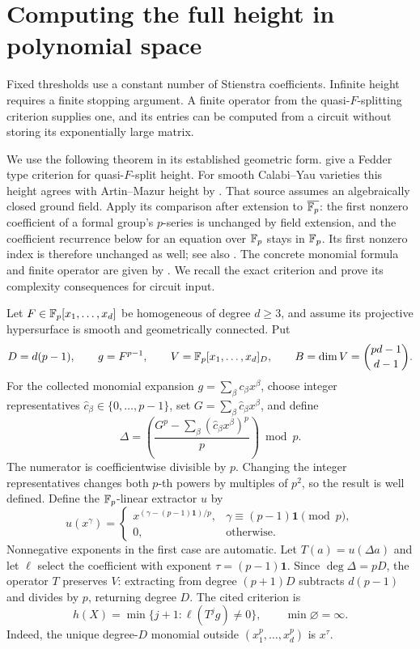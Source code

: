 \section{Computing the full height in polynomial space}\label{fg:sec:space}
Fixed thresholds use a constant number of Stienstra coefficients. Infinite
height requires a finite stopping argument. A finite operator from the
quasi-$F$-splitting criterion supplies one, and its entries can be computed
from a circuit without storing its exponentially large matrix.

We use the following theorem in its established geometric form.
\citet[Theorem~C, p.~4, and Theorem~5.8]{fg-kty-one} give a Fedder type
criterion for quasi-$F$-split height. For smooth Calabi--Yau varieties this
height agrees with Artin--Mazur height by
\citet[Theorem~4.5, pp.~9--10 of the preprint]{fg-yobuko}.
That source assumes an algebraically closed ground field. Apply its
comparison after extension to $\overline{\mathbb F_p}$: the first nonzero
coefficient of a formal group's $p$-series is unchanged by field
extension, and the coefficient recurrence below for an equation over
$\mathbb F_p$ stays in $\mathbb F_p$. Its first nonzero index is therefore unchanged
as well; see also \citet[Theorem~5.13]{fg-kty-one}.
The concrete monomial formula and finite operator
are given by \citet[Proposition~3.2, Remark~3.4 and Algorithms~2--4,
pp.~5--7]{fg-bgp}. We recall the exact criterion and prove its complexity
consequences for circuit input.

Let $F\in\mathbb F_p[x_1,\ldots,x_d]$ be homogeneous of degree $d\ge3$, and
assume its projective hypersurface is smooth and geometrically connected.
Put
\[
 D=d(p-1),\qquad g=F^{p-1},\qquad
 V=\mathbb F_p[x_1,\ldots,x_d]_D,\qquad
 B=\dim V=\binom{pd-1}{d-1}.
\]
For the collected monomial expansion $g=\sum_\beta c_\beta x^\beta$,
choose integer representatives $\widehat c_\beta\in\{0,\ldots,p-1\}$,
set $G=\sum_\beta\widehat c_\beta x^\beta$, and define
\begin{equation}\label{fg:eq:delta}
 \Delta=\left(\frac{G^p-\sum_\beta
                    (\widehat c_\beta x^\beta)^p}{p}\right)\bmod p.
\end{equation}
The numerator is coefficientwise divisible by $p$. Changing the integer
representatives changes both $p$-th powers by multiples of $p^2$, so
the result is well defined. Define the $\mathbb F_p$-linear extractor $u$ by
\[
 u(x^\gamma)=
 \begin{cases}
 x^{(\gamma-(p-1)\mathbf1)/p},
       &\gamma\equiv(p-1)\mathbf1\pmod p,\\
 0,&\text{otherwise}.
 \end{cases}
\]
Nonnegative exponents in the first case are automatic. Let
$T(a)=u(\Delta a)$ and let $\ell$ select the coefficient with exponent
$\tau=(p-1)\mathbf1$. Since $\deg\Delta=pD$, the operator $T$ preserves
$V$: extracting from degree $(p+1)D$ subtracts $d(p-1)$ and divides by
$p$, returning degree $D$.
The cited criterion is
\begin{equation}\label{fg:eq:finite-operator}
 h(X)=\min\{j+1:\ell(T^jg)\ne0\},
 \qquad \min\varnothing=\infty.
\end{equation}
Indeed, the unique degree-$D$ monomial outside
$(x_1^p,\ldots,x_d^p)$ is $x^\tau$.

